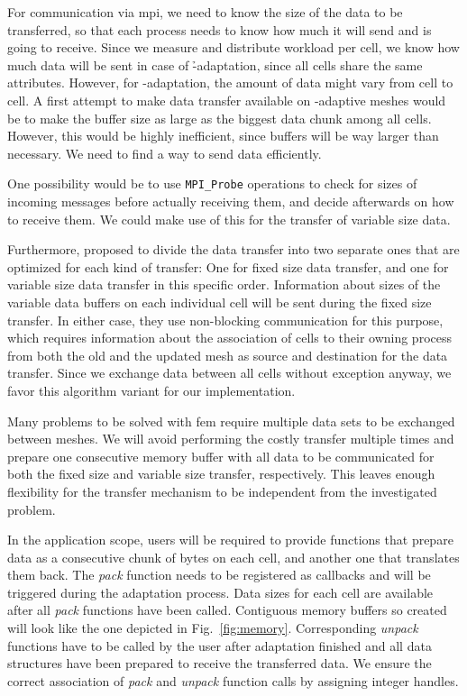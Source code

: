 For communication via \gls{mpi}, we need to know the size of the data to be transferred, so that each process needs to know how much it will send and is going to receive. Since we measure and distribute workload per cell, we know how much data will be sent in case of \h-adaptation, since all cells share the same attributes. However, for \p-adaptation, the amount of data might vary from cell to cell.
A first attempt to make data transfer available on \hp-adaptive meshes would be to make the buffer size as large as the biggest data chunk among all cells. However, this would be highly inefficient, since buffers will be way larger than necessary. We need to find a way to send data efficiently.

One possibility would be to use \texttt{MPI\_Probe} \textcite{mpi31} operations to check for sizes of incoming messages before actually receiving them, and decide afterwards on how to receive them. We could make use of this for the transfer of variable size data.

Furthermore, \textcite[Sec.~5.2]{burstedde2018} proposed to divide the data transfer into two separate ones that are optimized for each kind of transfer: One for fixed size data transfer, and one for variable size data transfer in this specific order. Information about sizes of the variable data buffers on each individual cell will be sent during the fixed size transfer. In either case, they use non-blocking communication for this purpose, which requires information about the association of cells to their owning process from both the old and the updated mesh as source and destination for the data transfer. Since we exchange data between all cells without exception anyway, we favor this algorithm variant for our implementation.

Many problems to be solved with \gls{fem} require multiple data sets to be exchanged between meshes. We will avoid performing the costly transfer multiple times and prepare one consecutive memory buffer with all data to be communicated for both the fixed size and variable size transfer, respectively. This leaves enough flexibility for the transfer mechanism to be independent from the investigated problem.

In the application scope, users will be required to provide functions that prepare data as a consecutive chunk of bytes on each cell, and another one that translates them back. The \textit{pack} function needs to be registered as callbacks and will be triggered during the adaptation process. Data sizes for each cell are available after all \textit{pack} functions have been called. Contiguous memory buffers so created will look like the one depicted in Fig.~\ref{fig:memory}. Corresponding \textit{unpack} functions have to be called by the user after adaptation finished and all data structures have been prepared to receive the transferred data. We ensure the correct association of \textit{pack} and \textit{unpack} function calls by assigning integer handles.

